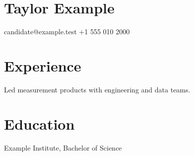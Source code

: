 \documentclass[11pt]{article}
\begin{document}
\section*{Taylor Example}
candidate@example.test \quad +1 555 010 2000
\section*{Experience}
Led measurement products with engineering and data teams.
\section*{Education}
Example Institute, Bachelor of Science
\end{document}
